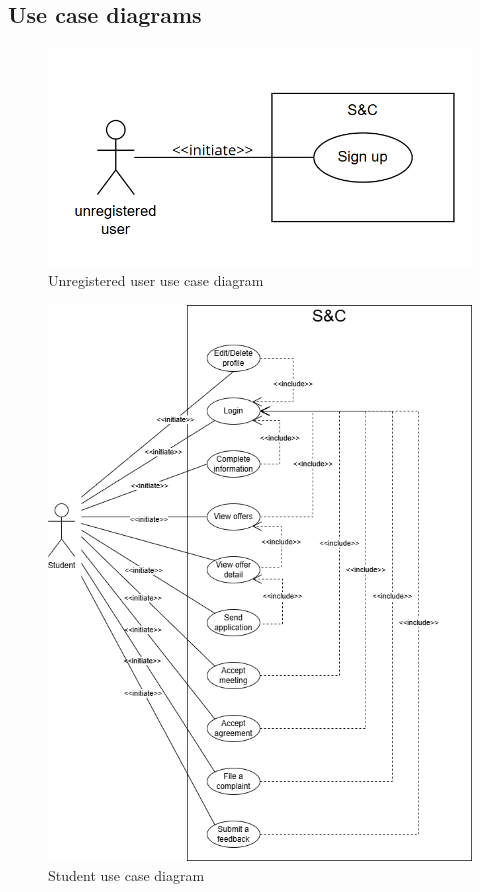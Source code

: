 \subsection{Use case diagrams}
\label{subsec: use_case_diag}%

\begin{figure}[H]
    \centering
    \includegraphics[width=1\linewidth]{Images/use case diagrams/UNREGISTERED_USER.png}
    \caption{Unregistered user use case diagram}
    \label{fig:enter-label}
\end{figure}

\begin{figure}[H]
    \centering
    \includegraphics[width=1\linewidth]{Images/use case diagrams/STUDENT.png}
    \caption{Student use case diagram}
    \label{fig:enter-label}
\end{figure}


